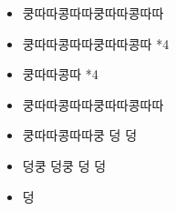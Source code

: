 \documentclass[	20pt, 
							a1paper, 
							portrait, %
							margin=0mm, %
							innermargin=10mm,  		%
							blockverticalspace=4mm, %
							colspace=5mm, 
							subcolspace=0mm
							]{tikzposter}
\begin{document}
\begin{columns}
{\begin{LARGE}
\begin{itemize}
			\end{itemize}
			\end{LARGE}
		}

		{
			\setlength{\leftmargini}{2em}			
			\setlength{\labelsep}{1em} 
			\begin{LARGE}
			\begin{itemize}

			\item 쿵따따콩따따쿵따따콩따따 
			\item 쿵따따콩따따쿵따따콩따 *4
			\item 쿵따따콩따 *4
			\item 쿵따따콩따따쿵따따콩따따 
			\item 쿵따따콩따따쿵 덩 덩
			\item 덩쿵 덩쿵 덩 덩
			\item 덩

			\end{itemize}
			\end{LARGE}
		}


	\end{columns}
\end{document}
